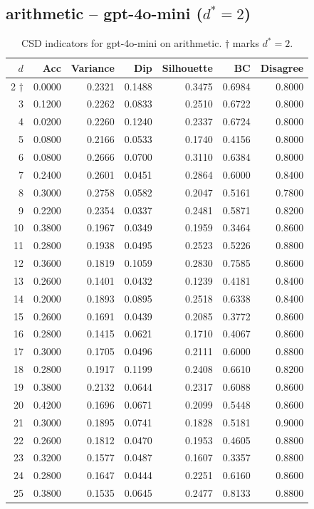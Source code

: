 \documentclass[11pt]{article}
\begin{document}
\subsection{arithmetic -- gpt-4o-mini ($d^*=2$)}

\begin{table}[h]\centering\small
\begin{tabular}{r|r|r|r|r|r|r}
\toprule
$d$ & Acc & Variance & Dip & Silhouette & BC & Disagree \\
\midrule
2 $\dagger$ & 0.0000 & 0.2321 & 0.1488 & 0.3475 & 0.6984 & 0.8000 \\
3 & 0.1200 & 0.2262 & 0.0833 & 0.2510 & 0.6722 & 0.8000 \\
4 & 0.0200 & 0.2260 & 0.1240 & 0.2337 & 0.6724 & 0.8000 \\
5 & 0.0800 & 0.2166 & 0.0533 & 0.1740 & 0.4156 & 0.8000 \\
6 & 0.0800 & 0.2666 & 0.0700 & 0.3110 & 0.6384 & 0.8000 \\
7 & 0.2400 & 0.2601 & 0.0451 & 0.2864 & 0.6000 & 0.8400 \\
8 & 0.3000 & 0.2758 & 0.0582 & 0.2047 & 0.5161 & 0.7800 \\
9 & 0.2200 & 0.2354 & 0.0337 & 0.2481 & 0.5871 & 0.8200 \\
10 & 0.3800 & 0.1967 & 0.0349 & 0.1959 & 0.3464 & 0.8600 \\
11 & 0.2800 & 0.1938 & 0.0495 & 0.2523 & 0.5226 & 0.8800 \\
12 & 0.3600 & 0.1819 & 0.1059 & 0.2830 & 0.7585 & 0.8600 \\
13 & 0.2600 & 0.1401 & 0.0432 & 0.1239 & 0.4181 & 0.8400 \\
14 & 0.2000 & 0.1893 & 0.0895 & 0.2518 & 0.6338 & 0.8400 \\
15 & 0.2600 & 0.1691 & 0.0439 & 0.2085 & 0.3772 & 0.8600 \\
16 & 0.2800 & 0.1415 & 0.0621 & 0.1710 & 0.4067 & 0.8600 \\
17 & 0.3000 & 0.1705 & 0.0496 & 0.2111 & 0.6000 & 0.8800 \\
18 & 0.2800 & 0.1917 & 0.1199 & 0.2408 & 0.6610 & 0.8200 \\
19 & 0.3800 & 0.2132 & 0.0644 & 0.2317 & 0.6088 & 0.8600 \\
20 & 0.4200 & 0.1696 & 0.0671 & 0.2099 & 0.5448 & 0.8600 \\
21 & 0.3000 & 0.1895 & 0.0741 & 0.1828 & 0.5181 & 0.9000 \\
22 & 0.2600 & 0.1812 & 0.0470 & 0.1953 & 0.4605 & 0.8800 \\
23 & 0.3200 & 0.1577 & 0.0487 & 0.1607 & 0.3357 & 0.8800 \\
24 & 0.2800 & 0.1647 & 0.0444 & 0.2251 & 0.6160 & 0.8600 \\
25 & 0.3800 & 0.1535 & 0.0645 & 0.2477 & 0.8133 & 0.8800 \\
\bottomrule
\end{tabular}
\caption{CSD indicators for gpt-4o-mini on arithmetic. $\dagger$ marks $d^*=2$.}
\end{table}
\end{document}
